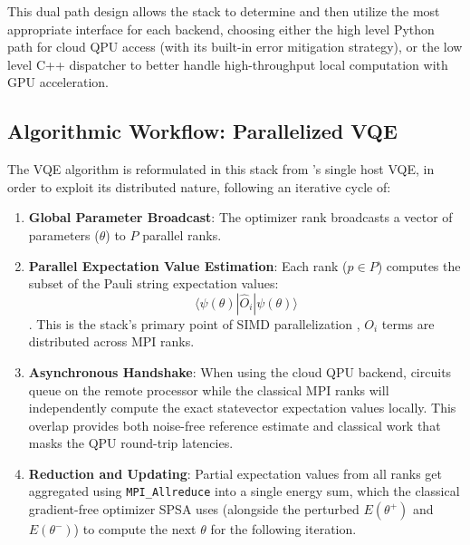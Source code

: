 This dual path design allows the stack to determine and then utilize the most appropriate interface for each backend, 
choosing either the high level Python path for cloud QPU access (with its built-in error mitigation strategy), or the 
low level C++ dispatcher to better handle high-throughput local computation with GPU acceleration.

\subsection{Algorithmic Workflow: Parallelized VQE}
The VQE algorithm is reformulated in this stack from \textcite{peruzzo2014variational}'s single host VQE, in order to exploit its distributed nature, 
following an iterative cycle of: 
    \begin{enumerate}
        \item \textbf{Global Parameter Broadcast}: The optimizer rank broadcasts a vector of parameters ($\theta$) to $P$ parallel ranks.
        \item \textbf{Parallel Expectation Value Estimation}: Each rank ($p \in P$) computes the subset of the Pauli string expectation values: $$\langle\psi(\theta)|\hat{O}_i|\psi(\theta)\rangle$$. This is the stack's primary point of SIMD parallelization \parencite{bayraktar2023cuquantum}, $O_i$ terms are distributed across MPI ranks.
        \item \textbf{Asynchronous Handshake}: When using the cloud QPU backend, circuits queue on the remote processor while the classical MPI ranks will independently compute the exact statevector expectation values locally. This overlap provides both noise-free reference estimate and classical work that masks the QPU round-trip latencies.
        \item \textbf{Reduction and Updating}: Partial expectation values from all ranks get aggregated using \texttt{MPI\_Allreduce} into a single energy sum, which the classical gradient-free optimizer SPSA \parencite{pellow2021classicoptimizers} uses (alongside the perturbed $E(\theta^+)$ and $E(\theta^-)$) to compute the next $\theta$ for the following iteration.
    \end{enumerate}

